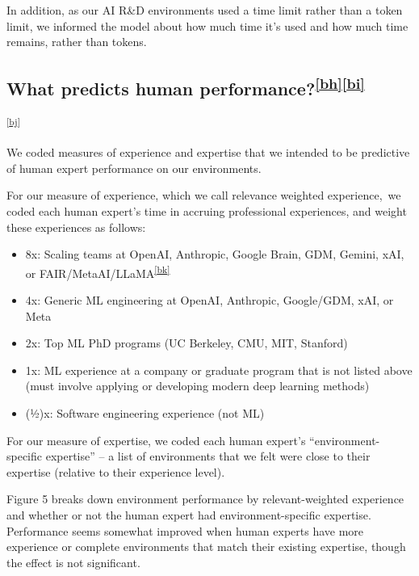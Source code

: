 \documentclass[
]{article}
\providecommand{\tightlist}{%
  \setlength{\itemsep}{0pt}\setlength{\parskip}{0pt}}
\begin{document}
{In addition, as our AI R\&D environments used a time limit rather than
a token limit, we informed the model about how much time it's used and
how much time remains, rather than tokens. }

\subsection{\texorpdfstring{{What predicts human
performance?}\textsuperscript{\protect\hypertarget{cmnt_ref60}{}\hyperref[cmnt60]{{[}bh{]}}\protect\hypertarget{cmnt_ref61}{}\hyperref[cmnt61]{{[}bi{]}}}}{What predicts human performance?{[}bh{]}{[}bi{]}}}\label{h.uynde5ffwu6k}

\textsuperscript{\label{cmnt_ref62}\hyperref[cmnt62]{{[}bj{]}}}

{We coded measures of experience and expertise that we intended to be
predictive of human expert performance on our environments.}

{}

{For our measure of experience, which we call }{relevance weighted
experience}{,}{~we coded each human expert's time in accruing
professional experiences, and weight these experiences as follows:}

{}

\begin{itemize}
\tightlist
\item
  {8x: }{Scaling teams at OpenAI, Anthropic, }{Google Brain, GDM,
  Gemini, xAI, or
  FAIR/Meta}{AI/LLaMA}\textsuperscript{\label{cmnt_ref63}\hyperref[cmnt63]{{[}bk{]}}}
\item
  {4x: }{Generic ML engineering at OpenAI, Anthropic, Google/GDM, xAI,
  or Meta}
\item
  {2x: }{Top ML PhD programs (UC Berkeley, CMU, MIT, Stanford)}
\item
  {1x: }{ML experience at a company or graduate program that is not
  listed above (must involve applying or developing }{modern deep
  learning methods)}
\item
  {(½)x: }{Software engineering experience (not ML)}
\end{itemize}

{}

{For our measure of expertise, we coded each human expert's
``environment-specific expertise'' -- a list of environments that we
felt were close to their expertise (relative to their experience level).
}

{}

{Figure 5 breaks down environment performance by relevant-weighted
experience and whether or not the human expert had environment-specific
expertise. Performance seems somewhat improved when human experts have
more experience or complete environments that match their existing
expertise, though the effect is not significant. }
\end{document}
